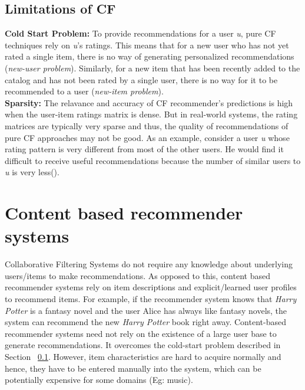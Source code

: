 \subsection{Limitations of CF}
\label{sec:limCF}
\textbf{Cold Start Problem:} To provide recommendations for a user \textit{u}, pure CF techniques rely on \textit{u}'s ratings. This means that for a new user who has not yet rated a single item, there is no way of generating personalized recommendations (\textit{new-user problem}). 
Similarly, for a new item that has been recently added to the catalog and has not been rated by a single user, there is no way for it to be recommended to a user (\textit{new-item problem}).\\
\textbf{Sparsity:} The relavance and accuracy of CF recommender's predictions is high when the user-item ratings matrix is dense.
But in real-world systems, the rating matrices are typically very sparse and thus, the quality of recommendations of pure CF approaches may not be good.
As an example, consider a user \textit{u} whose rating pattern is very different from most of the other users. 
He would find it difficult to receive useful recommendations because the number of similar users to \textit{u} is very less(\cite{balab1997}).




%

%

\section{Content based recommender systems}
\label{sec:content}
Collaborative Filtering Systems do not require any knowledge about underlying users/items to make recommendations.
As opposed to this, content based recommender systems rely on item descriptions and explicit/learned user profiles to recommend items.
For example, if the recommender system knows that \textit{Harry Potter} is a fantasy novel and the user Alice has always like fantasy novels, the system can recommend the new \textit{Harry Potter} book right away. 
Content-based recommender systems need not rely on the existence of a large user base to generate recommendations.
It overcomes the cold-start problem described in Section ~\ref{sec:limCF}. However, item characteristics are hard to acquire normally and hence, they have to be entered manually into the system, which can be potentially expensive for some domains (Eg: music).

